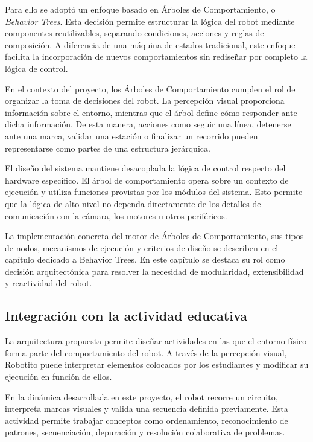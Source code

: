 \documentclass{prgrado}
\begin{document}
Para ello se adoptó un enfoque basado en Árboles de Comportamiento, o \textit{Behavior Trees}. Esta decisión permite estructurar la lógica del robot mediante componentes reutilizables, separando condiciones, acciones y reglas de composición. A diferencia de una máquina de estados tradicional, este enfoque facilita la incorporación de nuevos comportamientos sin rediseñar por completo la lógica de control.

En el contexto del proyecto, los Árboles de Comportamiento cumplen el rol de organizar la toma de decisiones del robot. La percepción visual proporciona información sobre el entorno, mientras que el árbol define cómo responder ante dicha información. De esta manera, acciones como seguir una línea, detenerse ante una marca, validar una estación o finalizar un recorrido pueden representarse como partes de una estructura jerárquica.

El diseño del sistema mantiene desacoplada la lógica de control respecto del hardware específico. El árbol de comportamiento opera sobre un contexto de ejecución y utiliza funciones provistas por los módulos del sistema. Esto permite que la lógica de alto nivel no dependa directamente de los detalles de comunicación con la cámara, los motores u otros periféricos.

La implementación concreta del motor de Árboles de Comportamiento, sus tipos de nodos, mecanismos de ejecución y criterios de diseño se describen en el capítulo dedicado a Behavior Trees. En este capítulo se destaca su rol como decisión arquitectónica para resolver la necesidad de modularidad, extensibilidad y reactividad del robot.

\subsection{Integración con la actividad educativa}

La arquitectura propuesta permite diseñar actividades en las que el entorno físico forma parte del comportamiento del robot. A través de la percepción visual, Robotito puede interpretar elementos colocados por los estudiantes y modificar su ejecución en función de ellos.

En la dinámica desarrollada en este proyecto, el robot recorre un circuito, interpreta marcas visuales y valida una secuencia definida previamente. Esta actividad permite trabajar conceptos como ordenamiento, reconocimiento de patrones, secuenciación, depuración y resolución colaborativa de problemas.
\end{document}
